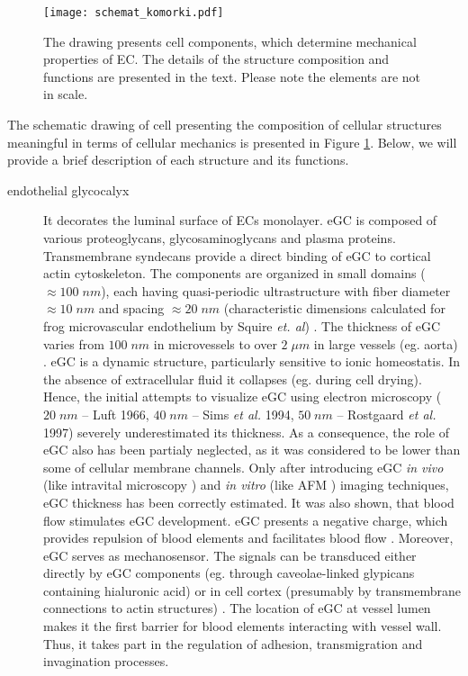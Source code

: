 \begin{figure}[tb]%
\centering
\texttt{[image: schemat\_komorki.pdf]}
\caption[Scheme presenting cellular structures determining mechanical properties of \gls{EC}.]{The drawing presents cell components, which determine mechanical properties of \gls{EC}. The details of the structure composition and functions are presented in the text. Please note the elements are not in scale.}
\label{fig:intro:cell_structure}
\end{figure}
The schematic drawing of cell presenting the composition of cellular structures meaningful in terms of cellular mechanics is presented in Figure \ref{fig:intro:cell_structure}. Below, we will provide a brief description of each structure and its functions.
\begin{description}
\item[endothelial glycocalyx] It decorates the luminal surface of \glspl{EC} monolayer. \gls{eGC} is composed of various proteoglycans, glycosaminoglycans and plasma proteins. Transmembrane syndecans provide a direct binding of \gls{eGC} to cortical actin cytoskeleton. The components are organized in small domains ($\approx 100\;nm$), each having quasi-periodic ultrastructure with fiber diameter $\approx 10\;nm$ and spacing $\approx 20\;nm$ (characteristic dimensions calculated for frog microvascular endothelium by Squire \emph{et. al}) \cite{Squire2001}. The thickness of \gls{eGC} varies from $100\;nm$ in microvessels to over $2\;\mu m$ in large vessels (eg. aorta) \cite{Fu2013,Wiesinger2013}. \gls{eGC} is a dynamic structure, particularly sensitive to ionic homeostatis. In the absence of extracellular fluid it collapses (eg. during cell drying). Hence, the initial attempts to visualize \gls{eGC} using electron microscopy ($20\;nm$ -- Luft 1966, $40\;nm$ -- Sims \emph{et al.} 1994, $50\;nm$ -- Rostgaard \emph{et al.} 1997) severely underestimated its thickness. As a consequence, the role of \gls{eGC} also has been partialy neglected, as it was considered to be lower than some of cellular membrane channels. Only after introducing \gls{eGC} \emph{in vivo} (like intravital microscopy \cite{Gao2010}) and \emph{in vitro} (like \gls{AFM} \cite{Oberleithner2011}) imaging techniques, \gls{eGC} thickness has been correctly estimated. It was also shown, that blood flow stimulates \gls{eGC} development.
\gls{eGC} presents a negative charge, which provides repulsion of blood elements and facilitates blood flow \cite{Schnitzer1988}. Moreover, \gls{eGC} serves as mechanosensor. The signals can be transduced either directly by \gls{eGC} components (eg. through caveolae-linked glypicans containing hialuronic acid) or in cell cortex (presumably by transmembrane connections to actin structures) \cite{Davies1995}. The location of \gls{eGC} at vessel lumen makes it the first barrier for blood elements interacting with vessel wall. Thus, it takes part in the regulation of adhesion, transmigration and invagination processes.

\end{description}
